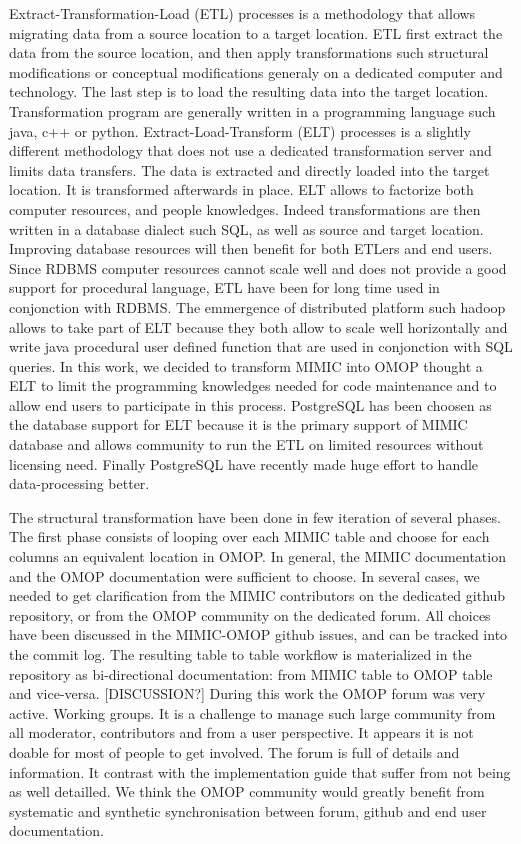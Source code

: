Extract-Transformation-Load (ETL) processes is a methodology that allows
migrating data from a source location to a target location. ETL first extract
the data from the source location, and then apply transformations such
structural modifications or conceptual modifications generaly on a dedicated
computer and technology. The last step is to load the resulting data into the
target location. Transformation program are generally written in a programming
language such java, c++ or python.
Extract-Load-Transform (ELT) processes is a slightly different methodology that
does not use a dedicated transformation server and limits data transfers. The
data is extracted and directly loaded into the target location. It is
transformed afterwards in place. ELT allows to factorize both computer
resources, and people knowledges. Indeed transformations are then written in a
database dialect such SQL, as well as source and target location. Improving
database resources will then benefit for both ETLers and end users. Since RDBMS
computer resources cannot scale well and does not provide a good support for
procedural language, ETL have been for long time used in conjonction with
RDBMS. The emmergence of distributed platform such hadoop allows to take part
of ELT because they both allow to scale well horizontally and write java
procedural user defined function that are used in conjonction with SQL queries.
In this work, we decided to transform MIMIC into OMOP thought a ELT to limit
the programming knowledges needed for code maintenance and to allow end users
to participate in this process. PostgreSQL has been choosen as the database
support for ELT because it is the primary support of MIMIC database and allows
community to run the ETL on limited resources without licensing need. Finally
PostgreSQL have recently made huge effort to handle data-processing better.

The structural transformation have been done in few iteration of several phases.
The first phase consists of looping over each MIMIC table and choose for each
columns an equivalent location in OMOP. In general, the MIMIC documentation and
the OMOP documentation were sufficient to choose. In several cases, we needed
to get clarification from the MIMIC contributors on the dedicated github
repository, or from the OMOP community on the dedicated forum.
All choices have been discussed in the MIMIC-OMOP github issues, and can be
tracked into the commit log. The resulting table to table workflow is
materialized in the repository as bi-directional documentation: from MIMIC
table to OMOP table and vice-versa.
[DISCUSSION?] During this work the OMOP forum was very active. Working groups.
It is a challenge to manage such large community from all moderator,
contributors and from a user perspective. It appears it is not doable for most
of people to get involved. The forum is full of details and information. It
contrast with the implementation guide that suffer from not being as well
detailled. We think the OMOP community would greatly benefit from systematic
and synthetic synchronisation between forum, github and end user documentation.

